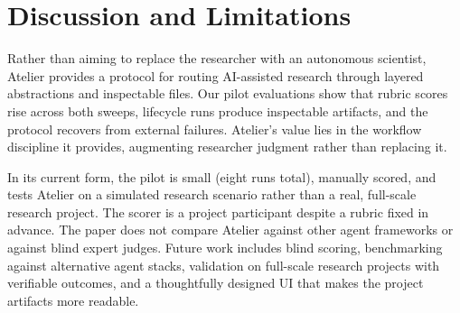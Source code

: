 \section{Discussion and Limitations}
\label{sec:discussion}

Rather than aiming to replace the researcher with an autonomous scientist, Atelier provides a protocol for routing AI-assisted research through layered abstractions and inspectable files. Our pilot evaluations show that rubric scores rise across both sweeps, lifecycle runs produce inspectable artifacts, and the protocol recovers from external failures. Atelier's value lies in the workflow discipline it provides, augmenting researcher judgment rather than replacing it.

In its current form, the pilot is small (eight runs total), manually scored, and tests Atelier on a simulated research scenario rather than a real, full-scale research project. The scorer is a project participant despite a rubric fixed in advance. The paper does not compare Atelier against other agent frameworks or against blind expert judges. Future work includes blind scoring, benchmarking against alternative agent stacks, validation on full-scale research projects with verifiable outcomes, and a thoughtfully designed UI that makes the project artifacts more readable.
